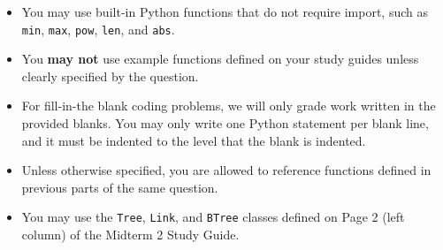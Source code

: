 \documentclass[twoside]{article}
\begin{document}
\begin{itemize}

\item You may use built-in Python functions that do not require import, such as
\lstinline$min$, \lstinline$max$, \lstinline$pow$, \lstinline$len$, and
\lstinline$abs$.

\item You \textbf{may not} use example functions defined on your study guides
unless clearly specified by the question.

\item For fill-in-the blank coding problems, we will only grade work written in
the provided blanks. You may only write one Python statement per blank line, and
it must be indented to the level that the blank is indented.

\item Unless otherwise specified, you are allowed to reference functions
defined in previous parts of the same question.

\item You may use the \lstinline$Tree$, \lstinline$Link$, and \lstinline$BTree$
classes defined on Page 2 (left column) of the Midterm 2 Study Guide.

\end{itemize}


\newpage
\begin{enumerate}
    
    \clearpage
    
    \clearpage
    
    \clearpage
\end{enumerate}

%
\end{document}
